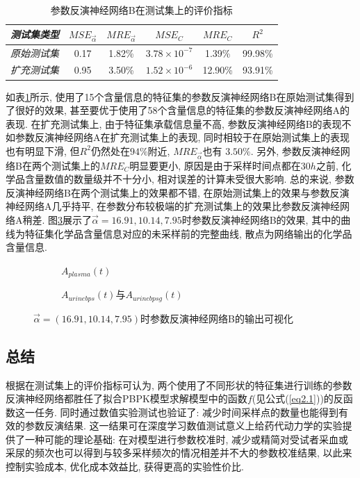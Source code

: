 \documentclass[a4paper,punct=banjiao,twoside]{ctexrep}
\theoremstyle{plain}
\theoremstyle{definition}
\theoremstyle{remark}
\begin{document}
\begin{table}[htbp]
  \centering
  \begin{tabular}[t]{l*{5}{c}}
    \hline
    \textit{测试集类型} &$MSE_{\vec{\alpha}}$&$MRE_{\vec{\alpha}}$ & $MSE_{C}$& $MRE_{C}$& $R^2$\\
    \hline
    \textit{原始测试集} &  0.17  &   1.82\%     &   $3.78\times 10^{-7}$     &  1.39\%     &  99.98\%  \\ 
    \textit{扩充测试集} &  0.95  &   3.50\%     &   $1.52\times 10^{-6}$     &  12.90\%     & 93.91\%  \\ 
    \hline
  \end{tabular}
  \caption{\label{tab4.2}参数反演神经网络B在测试集上的评价指标} 
\end{table}  

如表\ref{tab4.2}所示, 使用了15个含量信息的特征集的参数反演神经网络B在原始测试集得到了很好的效果, 甚至要优于使用了58个含量信息的特征集的参数反演神经网络A的表现. 
在扩充测试集上, 由于特征集承载信息量不高, 参数反演神经网络B的表现不如参数反演神经网络A在扩充测试集上的表现, 同时相较于在原始测试集上的表现也有明显下滑, 但$R^2$仍然处在$94\%$附近, $MRE_{\vec{\alpha}}$也有
$3.50\%$. 
另外, 参数反演神经网络B在两个测试集上的$MRE_{C}$明显要更小, 原因是由于采样时间点都在$30h$之前, 化学品含量数值的数量级并不十分小, 相对误差的计算未受很大影响.
总的来说, 参数反演神经网络B在两个测试集上的效果都不错, 在原始测试集上的效果与参数反演神经网络A几乎持平, 在参数分布较极端的扩充测试集上的效果比参数反演神经网络A稍差.
图\ref{反演B}展示了$\vec{\alpha}=16.91,10.14,7.95$时参数反演神经网络B的效果, 其中的曲线为特征集化学品含量信息对应的未采样前的完整曲线, 散点为网络输出的化学品含量信息.
\begin{figure}[H]
  \centering
  \begin{subfigure}{0.45\textwidth}
    \centering
    \resizebox{1\textwidth}{!}{}
    \caption{$A_{plasma}(t)$}
    \label{反演B1}
  \end{subfigure}
  \begin{subfigure}{0.45\textwidth}
    \centering
    \resizebox{1\textwidth}{!}{}
    \caption{$A_{urinebps}(t)$与$A_{urinebpsg}(t)$}
    \label{反演B2}
  \end{subfigure}
  \caption{$\vec{\alpha}=(16.91,10.14,7.95)$时参数反演神经网络B的输出可视化}
  \label{反演B}
\end{figure}

\subsection*{总结}
根据在测试集上的评价指标可认为, 两个使用了不同形状的特征集进行训练的参数反演神经网络都胜任了拟合PBPK模型求解模型中的函数$f$(见公式(\ref{eq2.1}))的反函数这一任务.
同时通过数值实验测试也验证了: 减少时间采样点的数量也能得到有效的参数反演结果. 这一结果可在深度学习数值测试意义上给药代动力学的实验提供了一种可能的理论基础: 在对模型进行参数校准时,
减少或精简对受试者采血或采尿的频次也可以得到与较多采样频次的情况相差并不大的参数校准结果, 以此来控制实验成本, 优化成本效益比, 获得更高的实验性价比.
\end{document}
